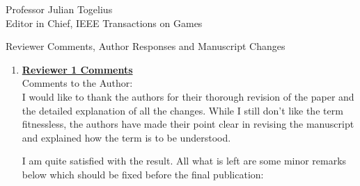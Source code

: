 \documentclass[10pt]{letter} %
\begin{document}
\begin{letter}{Professor Julian Togelius \\ Editor in Chief, IEEE Transactions on Games}
\newpage

Reviewer Comments, Author Responses and Manuscript Changes
\begin{enumerate}


\item {\bf \underline{ Reviewer 1 Comments}}\\
		Comments to the Author:\\
		I would like to thank the authors for their thorough revision of the paper and the detailed explanation of all the changes. While I still don't like the term fitnessless, the authors have made their point clear in revising the manuscript and explained how the term is to be understood.

		I am quite satisfied with the result. All what is left are some minor remarks below which should be fixed before the final publication:
		

\end{enumerate}
\end{letter}
\end{document}
